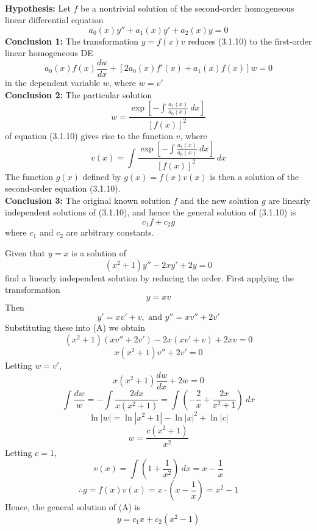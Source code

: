 \begin{theorem}{}{}
    \\\textbf{Hypothesis:} Let $f$ be a nontrivial solution of the second-order homogeneous linear differential equation
    \begin{equation}
        a_0(x)y'' + a_1(x)y' + a_2(x)y = 0
    \end{equation}
    \textbf{Conclusion 1:} The transformation $y = f(x)v$ reduces (3.1.10) to the first-order linear homogeneous DE \[
        a_0(x)f(x)\frac{dw}{dx} + [ 2a_0(x)f'(x) + a_1(x)f(x) ]w = 0
    \] in the dependent variable $w$, where $w = v'$ \\
    \textbf{Conclusion 2:} The particular solution \[
        w = \frac{\exp\left[ -\int{ \frac{a_1(x)}{a_0(x)} } \: d{x} \right]}{[f(x)]^2}
    \] of equation (3.1.10) gives rise to the function $v$, where \[
    v(x) = \int{ \frac{\exp\left[ -\int{\frac{a_1(x)}{a_0(x)}} \: d{x} \right]}{[f(x)]^2} } \: d{x}
    \] The function $g(x)$ defined by $g(x) = f(x)v(x)$ is then a solution of the second-order equation (3.1.10). \\
    \textbf{Conclusion 3:} The original known solution $f$ and the new solution $g$ are linearly independent solutions of (3.1.10), and hence the general solution of (3.1.10) is \[
        c_1f + c_2g
    \] where $c_1$ and $c_2$ are arbitrary constants.
\end{theorem}

\begin{example}{
        Given that $y=x$ is a solution of
        \begin{equation}\tag{A}
            (x^2+1)y'' - 2xy' + 2y = 0
        \end{equation}
        find a linearly independent solution by reducing the order.
    }{}
    First applying the transformation \[
        y = xv
    \] Then \[
        y' = xv' + v, \text{ and } y'' = xv'' + 2v'
    \] Substituting these into (A) we obtain \[
    (x^2+1)(xv''+2v') - 2x(xv'+v) + 2xv = 0
    \] \[ x(x^2+1)v'' + 2v' = 0 \]
    Letting $w = v'$,
    \[ x(x^2+1)\frac{dw}{dx} + 2w = 0 \]
    \[ \int{\frac{dw}{w}} = -\int{\frac{2dx}{x(x^2+1)}} = \int{\left( -\frac{2}{x} + \frac{2x}{x^2+1} \right)} \: d{x} \]
    \[ \ln|w| = \ln|x^2+1| - \ln|x|^2 + \ln|c| \]
    \[ w = \frac{c(x^2+1)}{x^2} \]
    Letting $c = 1$,
    \[ v(x) = \int{\left( 1 + \frac{1}{x^2} \right)} \: d{x} = x - \frac{1}{x} \]
    \[ \therefore g = f(x)v(x) = x\cdot\left( x-\frac{1}{x} \right) = x^2-1 \]
    Hence, the general solution of (A) is \[
        \boxed{ y = c_1x + c_2(x^2-1) }
    \]
\end{example}


